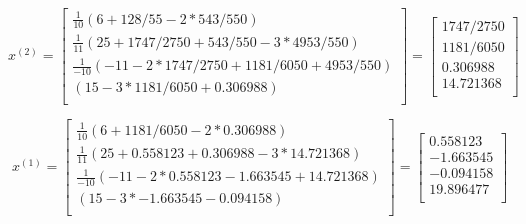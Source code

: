 \begin{equation*}
    x^{(2)} = \begin{bmatrix}
        \frac{1}{10} \left( 6 + 128/55 - 2*543/550 \right) \\
        \frac{1}{11} \left( 25 + 1747/2750 + 543/550 - 3*4953/550 \right) \\
        \frac{1}{-10} \left( -11 - 2*1747/2750 + 1181/6050 + 4953/550 \right) \\
        \left( 15 - 3*1181 / 6050 + 0.306988 \right) \\
    \end{bmatrix}
    = \begin{bmatrix}
        1747 / 2750 \\
        1181 / 6050 \\
        0.306988 \\
        14.721368 \\
    \end{bmatrix}
\end{equation*}

\begin{equation*}
    x^{(1)} = \begin{bmatrix}
        \frac{1}{10} \left( 6 + 1181 / 6050 - 2*0.306988 \right) \\
        \frac{1}{11} \left( 25 + 0.558123 + 0.306988 - 3*14.721368 \right) \\
        \frac{1}{-10} \left( -11 - 2*0.558123 - 1.663545 + 14.721368 \right) \\
        \left( 15 - 3*-1.663545 - 0.094158 \right) \\
    \end{bmatrix}
    = \begin{bmatrix}
        0.558123 \\
        -1.663545 \\
        -0.094158 \\
        19.896477 \\
    \end{bmatrix}
\end{equation*}